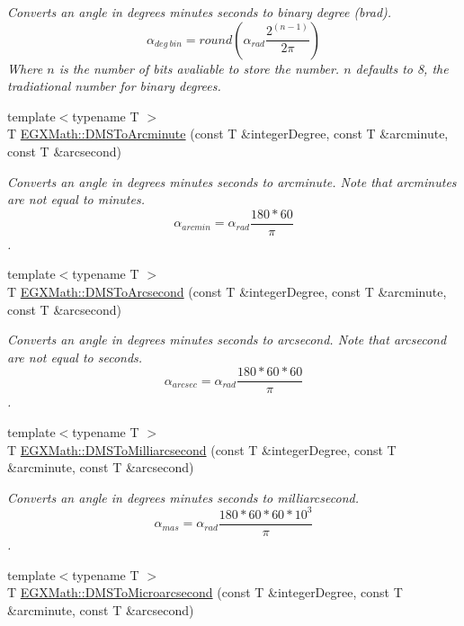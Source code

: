 \begin{DoxyCompactItemize}
\begin{DoxyCompactList}\small\item\em Converts an angle in degrees minutes seconds to binary degree (brad). \[\alpha_{deg\ bin}=round(\alpha_{rad}\frac{2^{(n-1)}}{2 \pi})\] Where $n$ is the number of bits avaliable to store the number. $n$ defaults to 8, the tradiational number for binary degrees. \end{DoxyCompactList}\item 
{\footnotesize template$<$typename T $>$ }\\T \mbox{\hyperlink{group___e_g_x_math-_angle_conversions-_d_m_s_gab0fa9a734b22ff812a83a7784280d6db}{E\+G\+X\+Math\+::\+D\+M\+S\+To\+Arcminute}} (const T \&integer\+Degree, const T \&arcminute, const T \&arcsecond)
\begin{DoxyCompactList}\small\item\em Converts an angle in degrees minutes seconds to arcminute. Note that arcminutes are not equal to minutes. \[\alpha_{arcmin}=\alpha_{rad}\frac{180 * 60}{\pi}\]. \end{DoxyCompactList}\item 
{\footnotesize template$<$typename T $>$ }\\T \mbox{\hyperlink{group___e_g_x_math-_angle_conversions-_d_m_s_gac9d0871ac2dd889cf9f3c00d25f8a013}{E\+G\+X\+Math\+::\+D\+M\+S\+To\+Arcsecond}} (const T \&integer\+Degree, const T \&arcminute, const T \&arcsecond)
\begin{DoxyCompactList}\small\item\em Converts an angle in degrees minutes seconds to arcsecond. Note that arcsecond are not equal to seconds. \[\alpha_{arcsec}=\alpha_{rad}\frac{180 * 60 * 60}{\pi}\]. \end{DoxyCompactList}\item 
{\footnotesize template$<$typename T $>$ }\\T \mbox{\hyperlink{group___e_g_x_math-_angle_conversions-_d_m_s_ga35a14699b2497a473f6a742ea2901557}{E\+G\+X\+Math\+::\+D\+M\+S\+To\+Milliarcsecond}} (const T \&integer\+Degree, const T \&arcminute, const T \&arcsecond)
\begin{DoxyCompactList}\small\item\em Converts an angle in degrees minutes seconds to milliarcsecond. \[\alpha_{mas}=\alpha_{rad}\frac{180 * 60 * 60 * 10^3}{\pi}\]. \end{DoxyCompactList}\item 
{\footnotesize template$<$typename T $>$ }\\T \mbox{\hyperlink{group___e_g_x_math-_angle_conversions-_d_m_s_ga1230f4c81771a59d9973beb0e6747dbf}{E\+G\+X\+Math\+::\+D\+M\+S\+To\+Microarcsecond}} (const T \&integer\+Degree, const T \&arcminute, const T \&arcsecond)

\end{DoxyCompactItemize}
